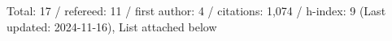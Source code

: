 Total: 17 / refereed: 11 / first author: 4 / citations: 1,074 / h-index: 9 (Last updated: 2024-11-16), List attached below